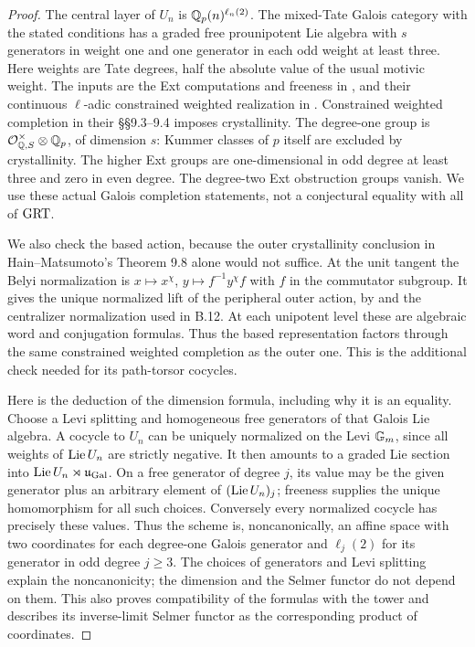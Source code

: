 \begin{proof}
The central layer of $U_n$ is $\mathbb Q_p(n)^{\ell_n(2)}$.
The mixed-Tate Galois category with the stated conditions
has a graded free prounipotent Lie algebra with $s$
generators in weight one and one generator in each odd
weight at least three. Here weights are Tate degrees,
half the absolute value of the usual motivic weight.
The inputs are the Ext computations and freeness in
\citet[(2.1.3), Proposition 2.3]{DeligneGoncharov2005},
and their continuous $\ell$-adic constrained weighted realization in
\citet[Proposition 9.6, proved using Proposition 9.3 and
Theorem 9.5]{HainMatsumoto2003}.
Constrained weighted completion in their \S\S9.3--9.4 imposes
crystallinity. The degree-one group is
$\mathcal O_{\mathbb Q,S}^{\times}\otimes\mathbb Q_p$, of dimension $s$:
Kummer classes of $p$ itself are excluded by crystallinity.
The higher Ext groups are one-dimensional in odd degree
at least three and zero in even degree. The degree-two
Ext obstruction groups vanish. We use these actual
Galois completion statements, not a conjectural equality
with all of $\mathrm{GRT}$.

We also check the based action, because the outer
crystallinity conclusion in Hain--Matsumoto's Theorem 9.8
alone would not suffice. At the unit tangent the Belyi
normalization is $x\mapsto x^\chi$,
$y\mapsto f^{-1}y^\chi f$ with $f$ in the commutator
subgroup. It gives the unique normalized lift of the
peripheral outer action, by
\citet[Theorem 1]{HarbaterSchneps2000} and the centralizer
normalization used in B.12. At each unipotent level these
are algebraic word and conjugation formulas. Thus the
based representation factors through the same constrained
weighted completion as the outer one. This is the
additional check needed for its path-torsor cocycles.

Here is the deduction of the dimension formula, including
why it is an equality. Choose a Levi splitting and homogeneous
free generators of that Galois Lie algebra. A cocycle to $U_n$
can be uniquely normalized on the Levi $\mathbb G_m$, since all
weights of $\operatorname{Lie} U_n$ are strictly negative. It then
amounts to a graded Lie section into
$\operatorname{Lie} U_n\rtimes\mathfrak u_{\rm Gal}$. On a free generator
of degree $j$, its value may be the given generator plus
an arbitrary element of $(\operatorname{Lie} U_n)_j$; freeness supplies
the unique homomorphism for all such choices. Conversely
every normalized cocycle has precisely these values.
Thus the scheme is, noncanonically, an affine space with
two coordinates for each degree-one Galois generator and
$\ell_j(2)$ for its generator in odd degree $j\ge3$.
The choices of generators and Levi splitting explain the
noncanonicity; the dimension and the Selmer functor do not
depend on them. This also proves compatibility of the
formulas with the tower and describes its inverse-limit
Selmer functor as the corresponding product of coordinates.


\end{proof}
